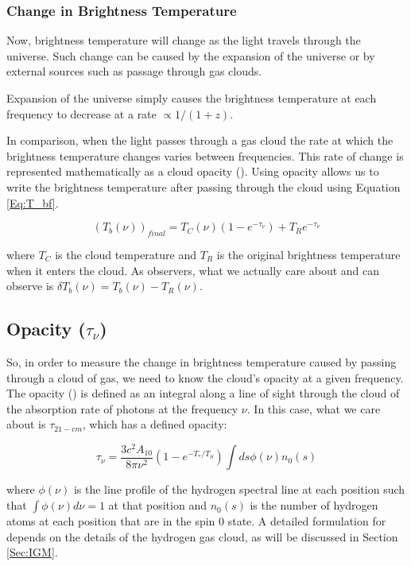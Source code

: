\subsubsection{Change in Brightness Temperature}
Now, brightness temperature will change as the light travels through the universe. Such change can be caused by the expansion of the universe or by external sources such as passage through gas clouds. 

Expansion of the universe simply causes the brightness temperature at each frequency to decrease at a rate $\propto 1/(1+z)$. 

In comparison, when the light passes through a gas cloud the rate at which the brightness temperature changes varies between frequencies. This rate of change is represented mathematically as a cloud opacity (\tu). Using opacity allows us to write the brightness temperature after passing through the cloud using Equation \ref{Eq:T_bf}. 

\begin{equation}\label{Eq:T_bf}
(T_b (\nu))_{final}= T_{C} (\nu) (1-e^{-\tau_\nu}) +T_{R} e^{-\tau_\nu}
\end{equation}

where $T_{C}$ is the cloud temperature and $T_{R}$ is the original brightness temperature when it enters the cloud. As observers, what we actually care about and can observe is $\delta T_b (\nu) = T_b (\nu) - T_R  (\nu)$. 

\subsection{Opacity ($\tau_\nu$)}
So, in order to measure the change in brightness temperature caused by passing through a cloud of gas, we need to know the cloud's opacity at a given frequency. The opacity (\tu) is defined as an integral along a line of sight through the cloud of the absorption rate of photons at the frequency $\nu$. In this case, what we care about is $\tau_{21-cm}$, which has a defined opacity:

\begin{equation}
\tau_{\nu} = \frac{3 c^2 A_{10}}{8 \pi \nu^2 } (1-e^{-T_*/T_S}) \int ds \phi (\nu) n_0(s)
\end{equation}

where $\phi (\nu)$ is the line profile of the hydrogen \cm spectral line at each position such that $\int \phi(\nu) d \nu = 1$ at that position and $n_0 (s)$ is the number of hydrogen atoms at each position that are in the spin 0 state. A detailed formulation for \tu depends on the details of the hydrogen gas cloud, as will be discussed in Section \ref{Sec:IGM}. 


